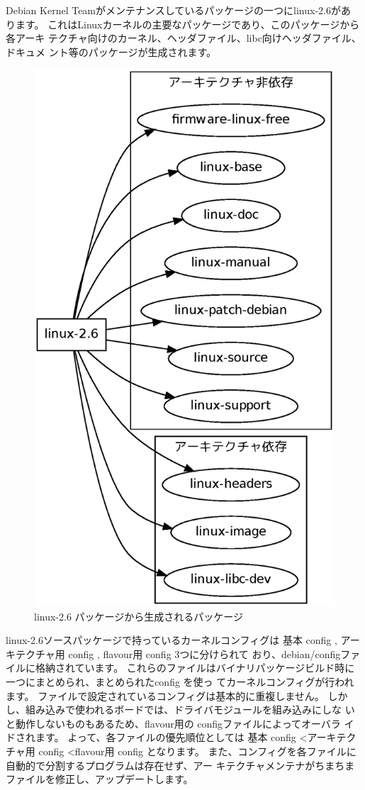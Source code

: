 \documentclass[mingoth,a4paper]{jsarticle}
\begin{document}
\begin{table}[ht]
\begin{minipage}{0.3\hsize}
Debian Kernel Teamがメンテナンスしているパッケージの一つにlinux-2.6があ
ります。
これはLinuxカーネルの主要なパッケージであり、このパッケージから各アーキ
テクチャ向けのカーネル、ヘッダファイル、libc向けヘッダファイル、ドキュメ
ント等のパッケージが生成されます。
\end{minipage}
\begin{minipage}{0.6\hsize}
\begin{figure}[H]
\begin{center}
\includegraphics[width=0.6\hsize]{image201005/debian-kernel-package.eps}
\caption{linux-2.6 パッケージから生成されるパッケージ}
\label{fig:debian-kernel-package}
\end{center}
\end{figure}
\end{minipage}
\end{table}

linux-2.6ソースパッケージで持っているカーネルコンフィグは
基本 config , アーキテクチャ用 config , flavour用 config 3つに分けられて
おり、debian/configファイルに格納されています。
これらのファイルはバイナリパッケージビルド時に一つにまとめられ、まとめられたconfig を使っ
てカーネルコンフィグが行われます。
ファイルで設定されているコンフィグは基本的に重複しません。
しかし、組み込みで使われるボードでは、ドライバモジュールを組み込みにしな
いと動作しないものもあるため、flavour用の configファイルによってオーバラ
イドされます。
よって、各ファイルの優先順位としては
基本 config \textless アーキテクチャ用 config \textless flavour用 config 
となります。
また、コンフィグを各ファイルに自動的で分割するプログラムは存在せず、アー
キテクチャメンテナがちまちまファイルを修正し、アップデートします。
\end{document}
